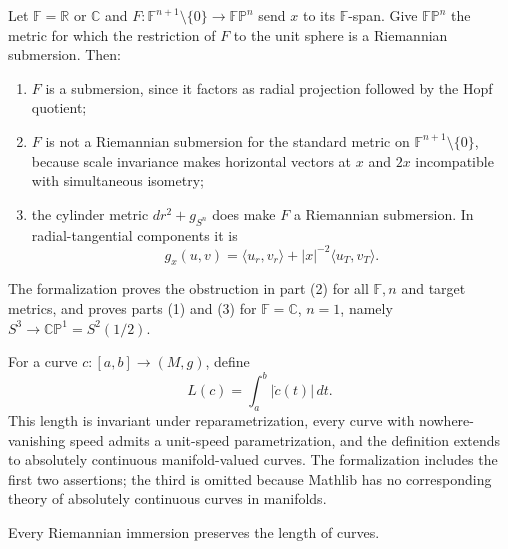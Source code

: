 \begin{remark}
  \label{rem:pet-ch1-ex-15}


  Let $\mathbb{F}=\mathbb{R}$ or $\mathbb{C}$ and
  $F:\mathbb{F}^{n+1}\setminus\{0\}\to\mathbb{FP}^n$ send $x$ to its
  $\mathbb{F}$-span. Give $\mathbb{FP}^n$ the metric for which the restriction
  of $F$ to the unit sphere is a Riemannian submersion. Then:
  \begin{enumerate}
    \item $F$ is a submersion, since it factors as radial projection followed
      by the Hopf quotient;
    \item $F$ is not a Riemannian submersion for the standard metric on
      $\mathbb{F}^{n+1}\setminus\{0\}$, because scale invariance makes
      horizontal vectors at $x$ and $2x$ incompatible with simultaneous
      isometry;
    \item the cylinder metric
      $dr^2+g_{S^n}$ does make $F$ a Riemannian submersion. In radial-tangential
      components it is
      \[
        g_x(u,v)=\langle u_r,v_r\rangle
          +|x|^{-2}\langle u_T,v_T\rangle.
      \]
  \end{enumerate}
  The formalization proves the obstruction in part (2) for all
  $\mathbb{F},n$ and target metrics, and proves parts (1) and (3) for
  $\mathbb{F}=\mathbb{C}$, $n=1$, namely
  $S^3\to\mathbb{CP}^1=S^2(1/2)$.
\end{remark}

\begin{remark}
  \label{rem:pet-ch1-ex-16}


  For a curve $c:[a,b]\to(M,g)$, define
  \[
    L(c)=\int_a^b|\dot c(t)|\,dt.
  \]
  This length is invariant under reparametrization, every curve with
  nowhere-vanishing speed admits a unit-speed parametrization, and the
  definition extends to absolutely continuous manifold-valued curves.
  The formalization includes the first two assertions; the third is omitted
  because Mathlib has no corresponding theory of absolutely continuous curves
  in manifolds.
\end{remark}

\begin{remark}
  \label{rem:pet-ch1-ex-17}


  Every Riemannian immersion preserves the length of curves.
\end{remark}

